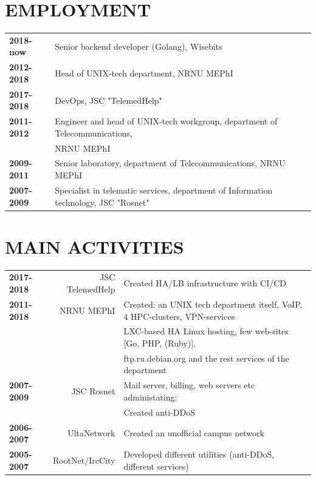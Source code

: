 \begin{resume}
\section{EMPLOYMENT}
\vspace{0.1in} 
\begin{tabular}{ll}
    {\bf 2018-now}  & Senior backend developer (Golang), Wisebits\\
    {\bf 2012-2018} & Head of UNIX-tech department, NRNU MEPhI\\
    {\bf 2017-2018} & DevOps, JSC "TelemedHelp"\\
    {\bf 2011-2012} & Engineer and head of UNIX-tech workgroup, department of Telecommunications,\\
                    & NRNU MEPhI\\
    {\bf 2009-2011} & Senior laboratory, department of Telecommunications, NRNU MEPhI\\
    {\bf 2007-2009} & Specialist in telematic services, department of Information technology, JSC "Rosnet"\\
\end{tabular}

\section{MAIN ACTIVITIES}
\vspace{0.1in} 
\begin{tabular}{lrl}
    {\bf 2017-2018} & JSC TelemedHelp & Created HA/LB infrastructure with CI/CD\\
    {\bf 2011-2018 }& NRNU MEPhI      & Created: an UNIX tech department itself, VoIP, 4 HPC-clusters, VPN-services\\
                    &                 & LXC-based HA Linux hosting, few web-sites [Go, PHP, (Ruby)],\\
                    &                 & ftp.ru.debian.org and the rest services of the department\\
    {\bf 2007-2009} & JSC Rosnet      & Mail server, billing, web servers etc administating:\\
                    &                 & Created anti-DDoS\\
    {\bf 2006-2007} & UltaNetwork     & Created an unofficial campus network\\
    {\bf 2005-2007} & RootNet/IrcCity & Developed different utilities (anti-DDoS, different services)\\
\end{tabular}


\end{resume}
